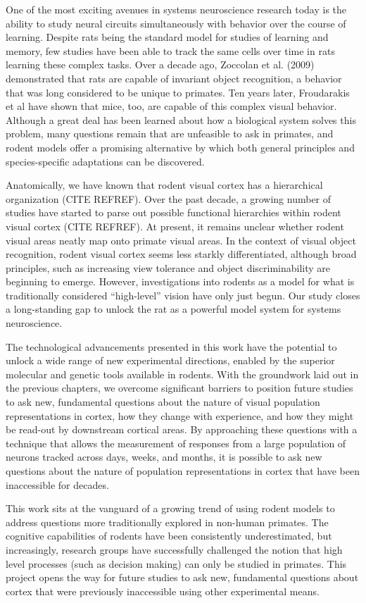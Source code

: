 One of the most exciting avenues in systems neuroscience research today is the ability to study neural circuits simultaneously with behavior over the course of learning. Despite rats being the standard model for studies of learning and memory, few studies have been able to track the same cells over time in rats learning these complex tasks. Over a decade ago, Zoccolan et al. (2009) demonstrated that rats are capable of invariant object recognition, a behavior that was long considered to be unique to primates. Ten years later, Froudarakis et al have shown that mice, too, are capable of this complex visual behavior. Although a great deal has been learned about how a biological system solves this problem, many questions remain that are unfeasible to ask in primates, and rodent models offer a promising alternative by which both general principles and species-specific adaptations can be discovered. 

Anatomically, we have known that rodent visual cortex has a hierarchical organization (CITE REFREF). Over the past decade, a growing number of studies have started to parse out possible functional hierarchies within rodent visual cortex (CITE REFREF). At present, it remains unclear whether rodent visual areas neatly map onto primate visual areas. In the context of visual object recognition, rodent visual cortex seems less starkly differentiated, although broad principles, such as increasing view tolerance and object discriminability are beginning to emerge. However, investigations into rodents as a model for what is traditionally considered “high-level” vision have only just begun. Our study closes a long-standing gap to unlock the rat as a powerful model system for systems neuroscience. 

The technological advancements presented in this work have the potential to unlock a wide range of new experimental directions, enabled by the superior molecular and genetic tools available in rodents. With the groundwork laid out in the previous chapters, we overcome significant barriers to position future studies to ask new, fundamental questions about the nature of visual population representations in cortex, how they change with experience, and how they might be read-out by downstream cortical areas. By approaching these questions with a technique that allows the measurement of responses from a large population of neurons tracked across days, weeks, and months, it is possible to ask new questions about the nature of population representations in cortex that have been inaccessible for decades.

This work sits at the vanguard of a growing trend of using rodent models to address questions more traditionally explored in non-human primates.  The cognitive capabilities of rodents have been consistently underestimated, but increasingly, research groups have successfully challenged the notion that high level processes (such as decision making) can only be studied in primates. This project opens the way for future studies to ask new, fundamental questions about cortex that were previously inaccessible using other experimental means. 